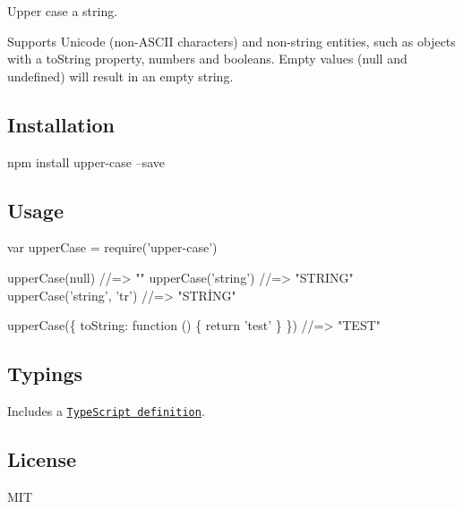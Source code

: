\href{https://npmjs.org/package/upper-case}{\tt } \href{https://npmjs.org/package/upper-case}{\tt } \href{https://travis-ci.org/blakeembrey/upper-case}{\tt } \href{https://coveralls.io/r/blakeembrey/upper-case?branch=master}{\tt }

Upper case a string.

Supports Unicode (non-\/\+A\+S\+C\+II characters) and non-\/string entities, such as objects with a {\ttfamily to\+String} property, numbers and booleans. Empty values ({\ttfamily null} and {\ttfamily undefined}) will result in an empty string.

\subsection*{Installation}


\begin{DoxyCode}
npm install upper-case --save
\end{DoxyCode}


\subsection*{Usage}


\begin{DoxyCode}
var upperCase = require('upper-case')

upperCase(null)           //=> ""
upperCase('string')       //=> "STRING"
upperCase('string', 'tr') //=> "STRİNG"

upperCase(\{ toString: function () \{ return 'test' \} \}) //=> "TEST"
\end{DoxyCode}


\subsection*{Typings}

Includes a \href{upper-case.d.ts}{\tt Type\+Script definition}.

\subsection*{License}

M\+IT 